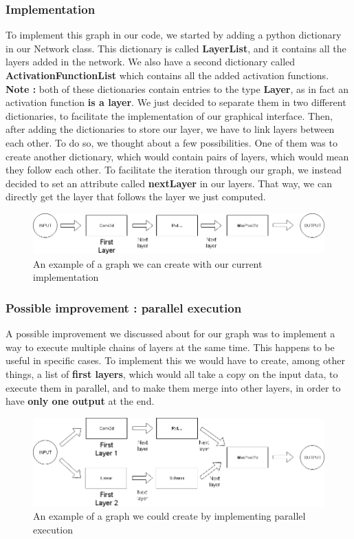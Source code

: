 \subsubsection{Implementation}
To implement this graph in our code, we started by adding a python dictionary in our Network class. This dictionary is called \textbf{LayerList}, and it contains all the layers added in the network. We also have a second dictionary called \textbf{ActivationFunctionList} which contains all the added activation functions. 
\newline\textbf{Note :} both of these dictionaries contain entries to the type \textbf{Layer}, as in fact an activation function \textbf{is a layer}. We just decided to separate them in two different dictionaries, to facilitate the implementation of our graphical interface.
\newline Then, after adding the dictionaries to store our layer, we have to link layers between each other. To do so, we thought about a few possibilities. One of them was to create another dictionary, which would contain pairs of layers, which would mean they follow each other.
\newline To facilitate the iteration through our graph, we instead decided to set an attribute called \textbf{nextLayer} in our layers. That way, we can directly get the layer that follows the layer we just computed.
\begin{figure}[]
    \centering 
    \includegraphics[scale=0.5]{figures/simple_graph.png}
    \caption{An example of a graph we can create with our current implementation}
\end{figure}
\subsubsection{Possible improvement : parallel execution}
A possible improvement we discussed about for our graph was to implement a way to execute multiple chains of layers at the same time. This happens to be useful in specific cases. To implement this we would have to create, among other things, a list of \textbf{first layers}, which would all take a copy on the input data, to execute them in parallel, and to make them merge into other layers, in order to have \textbf{only one output} at the end.
\begin{figure}[]
    \centering 
    \includegraphics[scale=0.5]{figures/dual_graph.png}
    \caption{An example of a graph we could create by implementing parallel execution}
\end{figure}
